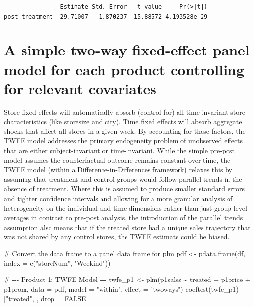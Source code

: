 \documentclass[
  letterpaper,
  DIV=11,
  numbers=noendperiod]{scrartcl}
\newenvironment{Shaded}{\begin{snugshade}}{\end{snugshade}}
\newcommand{\AttributeTok}[1]{\textcolor[rgb]{0.40,0.45,0.13}{#1}}
\newcommand{\CommentTok}[1]{\textcolor[rgb]{0.37,0.37,0.37}{#1}}
\newcommand{\ConstantTok}[1]{\textcolor[rgb]{0.56,0.35,0.01}{#1}}
\newcommand{\FunctionTok}[1]{\textcolor[rgb]{0.28,0.35,0.67}{#1}}
\newcommand{\NormalTok}[1]{\textcolor[rgb]{0.00,0.23,0.31}{#1}}
\newcommand{\OtherTok}[1]{\textcolor[rgb]{0.00,0.23,0.31}{#1}}
\newcommand{\SpecialCharTok}[1]{\textcolor[rgb]{0.37,0.37,0.37}{#1}}
\newcommand{\StringTok}[1]{\textcolor[rgb]{0.13,0.47,0.30}{#1}}
\begin{document}
\begin{verbatim}
                Estimate Std. Error   t value     Pr(>|t|)
post_treatment -29.71007   1.870237 -15.88572 4.193528e-29
\end{verbatim}

\section{A simple two-way fixed-effect panel model for each product
controlling for relevant
covariates}\label{a-simple-two-way-fixed-effect-panel-model-for-each-product-controlling-for-relevant-covariates}

Store fixed effects will automatically absorb (control for) all
time-invariant store characteristics (like storesize and city). Time
fixed effects will absorb aggregate shocks that affect all stores in a
given week. By accounting for these factors, the TWFE model addresses
the primary endogeneity problem of unobserved effects that are either
subject-invariant or time-invariant. While the simple pre-post model
assumes the counterfactual outcome remains constant over time, the TWFE
model (within a Difference-in-Differences framework) relaxes this by
assuming that treatment and control groups would follow parallel trends
in the absence of treatment. Where this is assumed to produce smaller
standard errors and tighter confidence intervals and allowing for a more
granular analysis of heterogeneity on the individual and time dimensions
rather than just group-level averages in contrast to pre-post analysis,
the introduction of the parallel trends assumption also means that if
the treated store had a unique sales trajectory that was not shared by
any control stores, the TWFE estimate could be biased.

\begin{Shaded}
\begin{Highlighting}[]
\CommentTok{\# Convert the data frame to a panel data frame for plm}
\NormalTok{pdf }\OtherTok{\textless{}{-}} \FunctionTok{pdata.frame}\NormalTok{(df, }\AttributeTok{index =} \FunctionTok{c}\NormalTok{(}\StringTok{"storeNum"}\NormalTok{, }\StringTok{"Weekind"}\NormalTok{))}

\CommentTok{\# {-}{-}{-} Product 1: TWFE Model {-}{-}{-}}
\NormalTok{twfe\_p1 }\OtherTok{\textless{}{-}} \FunctionTok{plm}\NormalTok{(p1sales }\SpecialCharTok{\textasciitilde{}}\NormalTok{ treated }\SpecialCharTok{+}\NormalTok{ p1price }\SpecialCharTok{+}\NormalTok{ p1prom,}
               \AttributeTok{data =}\NormalTok{ pdf,}
               \AttributeTok{model =} \StringTok{"within"}\NormalTok{,}
               \AttributeTok{effect =} \StringTok{"twoways"}\NormalTok{)}
\FunctionTok{coeftest}\NormalTok{(twfe\_p1)[}\StringTok{"treated"}\NormalTok{, , drop }\OtherTok{=} \ConstantTok{FALSE}\NormalTok{]}
\end{Highlighting}
\end{Shaded}
\end{document}
